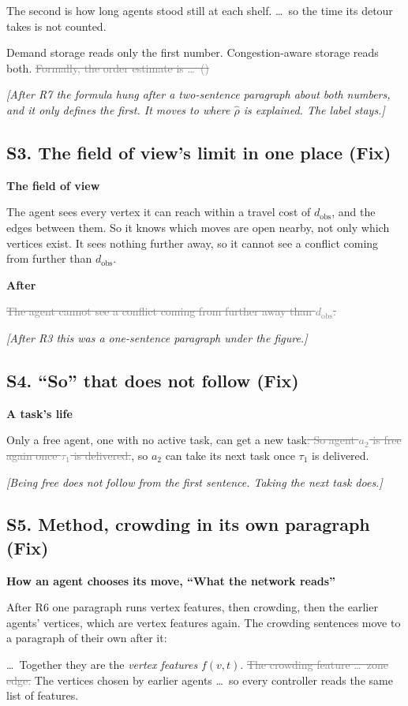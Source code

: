 \documentclass[11pt,a4paper]{article}
\newcommand{\new}[1]{\textcolor{newc}{#1}}
\newcommand{\old}[1]{\textcolor{gray}{\sout{#1}}}
\newcommand{\note}[1]{{\small\itshape [#1]}}
\newcommand{\lab}[1]{\textsf{\footnotesize\detokenize{#1}}}
\renewcommand{\eqref}[1]{(\lab{#1})}
\newcommand{\where}[1]{\par\textbf{#1}\par}
\begin{document}
The second is how long agents stood still at each shelf. \dots\ so the time
its detour takes is not counted.

Demand storage reads only the first number. Congestion-aware storage reads
both. \old{Formally, the order estimate is \dots\ \eqref{eq:estimates}}

\note{After R7 the formula hung after a two-sentence paragraph about both
numbers, and it only defines the first. It moves to where $\hat\rho$ is
explained. The label stays.}

\subsection*{S3. The field of view's limit in one place (Fix)}
\where{The field of view}
The agent sees every vertex it can reach within a travel cost of
$d_{\mathrm{obs}}$, and the edges between them. So it knows which moves are
open nearby, not only which vertices exist. It sees nothing further away\new{,
so it cannot see a conflict coming from further than $d_{\mathrm{obs}}$}.

\where{After \lab{fig:observation}}
\old{The agent cannot see a conflict coming from further away than
$d_{\mathrm{obs}}$.}

\note{After R3 this was a one-sentence paragraph under the figure.}

\subsection*{S4. ``So'' that does not follow (Fix)}
\where{A task's life}
Only a free agent, one with no active task, can get a new task\old{. So
agent $a_2$ is free again once $\tau_1$ is delivered.}\new{, so $a_2$ can take
its next task once $\tau_1$ is delivered.}

\note{Being free does not follow from the first sentence. Taking the next
task does.}

\subsection*{S5. Method, crowding in its own paragraph (Fix)}
\where{How an agent chooses its move, ``What the network reads''}
After R6 one paragraph runs vertex features, then crowding, then the
earlier agents' vertices, which are vertex features again. The crowding
sentences move to a paragraph of their own after it:

\dots\ Together they are the \emph{vertex features} $f(v,t)$. \old{The
crowding feature \dots\ zone edge.} The vertices chosen by earlier agents
\dots\ so every controller reads the same list of features.
\end{document}
